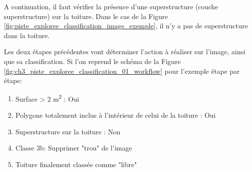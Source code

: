 A continuation, il faut vérifier la présence d'une superstructure (couche superstructure) sur la toiture. Dans le cas de la Figure \ref{fig:piste_exploree_classification_image_exemple}, il n'y a pas de superstructure dans la toiture.

Les deux étapes précédentes vont déterminer l'action à réaliser sur l'image, ainsi que sa classification. Si l'on reprend le schéma de la Figure \ref{fig:ch3_piste_exploree_classification_01_workflow} pour l'exemple étape par étape:
\begin{enumerate}
    \item Surface > 2 \si{\unit{\square\meter}} : Oui
    \item Polygone totalement inclus à l'intérieur de celui de la toiture : Oui
    \item Superstructure sur la toiture : Non
    \item Classe 3b: Supprimer "trou" de l'image
    \item Toiture finalement classée comme "libre"
\end{enumerate}

